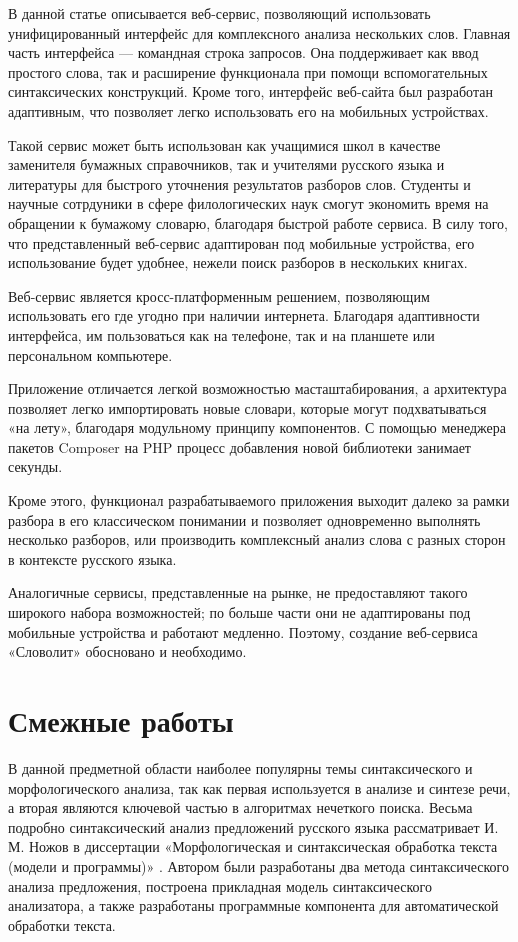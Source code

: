\documentclass[a4paper,12pt]{article}
\begin{document}
В данной статье описывается веб-сервис, позволяющий использовать унифицированный интерфейс для комплексного анализа нескольких слов. Главная часть интерфейса — командная строка запросов. Она поддерживает как ввод простого слова, так и расширение функционала при помощи вспомогательных синтаксических конструкций. Кроме того, интерфейс веб-сайта был разработан адаптивным, что позволяет легко использовать его на мобильных устройствах.

Такой сервис может быть использован как учащимися школ в качестве заменителя бумажных справочников, так и учителями русского языка и литературы для быстрого уточнения результатов разборов слов. Студенты и научные сотрдуники в сфере филологических наук смогут экономить время на обращении к бумажому словарю, благодаря быстрой работе сервиса. В силу того, что представленный веб-сервис адаптирован под мобильные устройства, его использование будет удобнее, нежели поиск разборов в нескольких книгах.

Веб-сервис является кросс-платформенным решением, позволяющим использовать его где угодно при наличии интернета. Благодаря адаптивности интерфейса, им пользоваться как на телефоне, так и на планшете или персональном компьютере.

Приложение отличается легкой возможностью масташтабирования, а архитектура позволяет легко импортировать новые словари, которые могут подхватываться «на лету», благодаря модульному принципу компонентов. С помощью менеджера пакетов Composer на PHP процесс добавления новой библиотеки занимает секунды.

Кроме этого, функционал разрабатываемого приложения выходит далеко за рамки разбора в его классическом понимании и позволяет одновременно выполнять несколько разборов, или производить комплексный анализ слова с разных сторон в контексте русского языка.

Аналогичные сервисы, представленные на рынке, не предоставляют такого широкого набора возможностей; по больше части они не адаптированы под мобильные устройства и работают медленно. Поэтому, создание веб-сервиса «Словолит» обосновано и необходимо.

\section{Смежные работы}
В данной предметной области наиболее популярны темы синтаксического и морфологического анализа, так как первая используется в анализе и синтезе речи, а вторая являются ключевой частью в алгоритмах нечеткого поиска. Весьма подробно синтаксический анализ предложений русского языка рассматривает И. М. Ножов в диссертации «Морфологическая и синтаксическая обработка текста (модели и программы)» \cite{nozhov}. Автором были разработаны два метода синтаксического анализа предложения, построена прикладная модель синтаксического анализатора, а также разработаны программные компонента для автоматической обработки текста.
\end{document}
